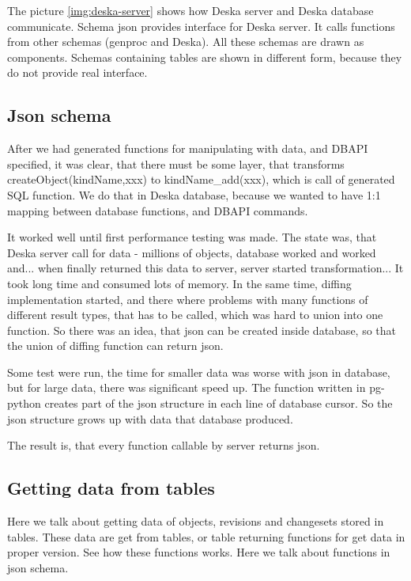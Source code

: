 \documentclass[deska]{subfiles}
\begin{document}
The picture \ref{img:deska-server} shows how Deska server and Deska database communicate. Schema json provides interface for Deska server. It
calls functions from other schemas (genproc and Deska). All these schemas are drawn as components. Schemas containing
tables are shown in different form, because they do not provide real interface.

\subsection{Json schema}
\label{sec:schema-json}
After we had generated functions for manipulating with data, and DBAPI specified, it was clear, that there must be some layer,
that transforms createObject(kindName,xxx) to kindName\_add(xxx), which is call of generated SQL function.
We do that in Deska database, because we wanted to have 1:1 mapping between database functions, and DBAPI commands.

It worked well until first performance testing was made. The state was, that Deska server call for data - millions of objects,
database worked and worked and... when finally returned this data to server, server started transformation... It took long time
and consumed lots of memory.
In the same time, diffing implementation started, and there where problems with many functions of different result types,
that has to be called, which was hard to union into one function.
So there was an idea, that json can be created inside database, so that the union of diffing function can return json.

Some test were run, the time for smaller data was worse with json in database, but for large data, there was significant
speed up. The function written in pg-python creates part of the json structure in each line of database cursor.
So the json structure grows up with data that database produced.

The result is, that every function callable by server returns json.

\subsection{Getting data from tables}
\label{sec:data-functions}
Here we talk about getting data of objects, revisions and changesets stored in tables.
These data are get from tables, or table returning functions for get data in proper version.
See  how these functions works. Here we talk about functions in json schema.
\end{document}
